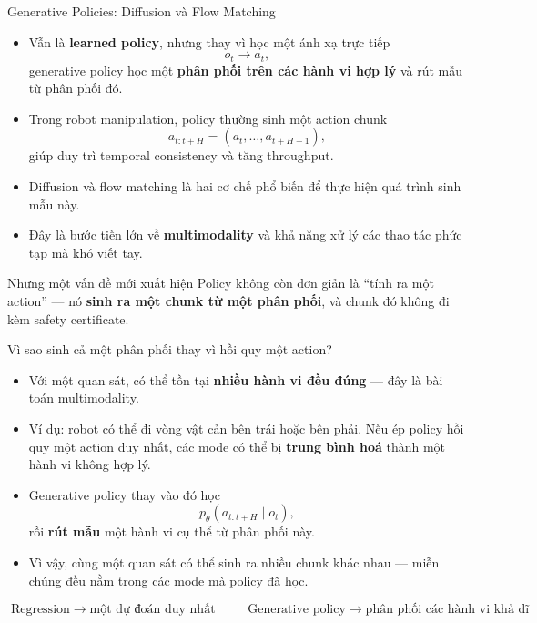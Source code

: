 \documentclass[aspectratio=169]{beamer}
\begin{document}
\begin{frame}[t,shrink=8]{Generative Policies: Diffusion và Flow Matching}

\begin{itemize}
    \item Vẫn là \textbf{learned policy}, nhưng thay vì học một ánh xạ
    trực tiếp
    \[
    o_t \rightarrow a_t,
    \]
    generative policy học một \textbf{phân phối trên các hành vi hợp lý}
    và rút mẫu từ phân phối đó.

    \item Trong robot manipulation, policy thường sinh một
    \alert{action chunk}
    \[
    a_{t:t+H}=(a_t,\ldots,a_{t+H-1}),
    \]
    giúp duy trì temporal consistency và tăng throughput.

    \item Diffusion và flow matching là hai cơ chế phổ biến để thực hiện
    quá trình sinh mẫu này.

    \item Đây là bước tiến lớn về \textbf{multimodality} và khả năng xử lý
    các thao tác phức tạp mà khó viết tay.

\end{itemize}

\begin{alertblock}{Nhưng một vấn đề mới xuất hiện}
Policy không còn đơn giản là ``tính ra một action'' ---
nó \textbf{sinh ra một chunk từ một phân phối}, và chunk đó
không đi kèm safety certificate.
\end{alertblock}
\end{frame}

\begin{frame}[t,shrink=8]{Vì sao sinh cả một phân phối thay vì hồi quy một action?}

\begin{itemize}
    \item Với một quan sát, có thể tồn tại \textbf{nhiều hành vi đều
    đúng} --- đây là bài toán \alert{multimodality}.

    \item Ví dụ: robot có thể đi vòng vật cản bên trái hoặc bên phải.
    Nếu ép policy hồi quy một action duy nhất, các mode có thể bị
    \textbf{trung bình hoá} thành một hành vi không hợp lý.

    \item Generative policy thay vào đó học
    \[
    p_\theta(a_{t:t+H}\mid o_t),
    \]
    rồi \textbf{rút mẫu} một hành vi cụ thể từ phân phối này.

    \item Vì vậy, cùng một quan sát có thể sinh ra nhiều chunk khác
    nhau --- miễn chúng đều nằm trong các mode mà policy đã học.

\end{itemize}

\vspace{4pt}
\begin{center}
\[
\boxed{
\text{Regression}
\;\rightarrow\;
\text{một dự đoán duy nhất}
}
\qquad
\boxed{
\text{Generative policy}
\;\rightarrow\;
\text{phân phối các hành vi khả dĩ}
}
\]
\end{center}
\end{frame}
\end{document}
